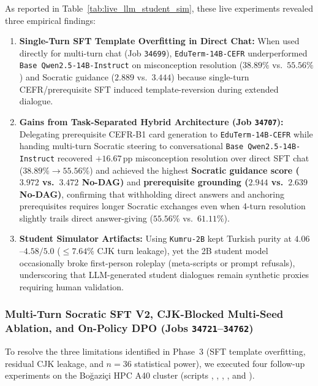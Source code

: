 \documentclass[a4paper,12pt]{report}
\begin{document}
As reported in Table~\ref{tab:live_llm_student_sim}, these live experiments revealed three empirical findings:
\begin{enumerate}
    \item \textbf{Single-Turn SFT Template Overfitting in Direct Chat:} When used directly for multi-turn chat (Job \texttt{34699}), \texttt{EduTerm-14B-CEFR} underperformed \texttt{Base Qwen2.5-14B-Instruct} on misconception resolution ($38.89\%$ vs.\ $55.56\%$) and Socratic guidance ($2.889$ vs.\ $3.444$) because single-turn CEFR/prerequisite SFT induced template-reversion during extended dialogue.
    \item \textbf{Gains from Task-Separated Hybrid Architecture (Job \texttt{34707}):} Delegating prerequisite CEFR-B1 card generation to \texttt{EduTerm-14B-CEFR} while handing multi-turn Socratic steering to conversational \texttt{Base Qwen2.5-14B-Instruct} recovered $+16.67$\,pp misconception resolution over direct SFT chat ($38.89\% \to 55.56\%$) and achieved the highest \textbf{Socratic guidance score ($3.972$ vs.\ $3.472$ No-DAG)} and \textbf{prerequisite grounding ($2.944$ vs.\ $2.639$ No-DAG)}, confirming that withholding direct answers and anchoring prerequisites requires longer Socratic exchanges even when 4-turn resolution slightly trails direct answer-giving ($55.56\%$ vs.\ $61.11\%$).
    \item \textbf{Student Simulator Artifacts:} Using \texttt{Kumru-2B} kept Turkish purity at $4.06$--$4.58/5.0$ ($\le 7.64\%$ CJK turn leakage), yet the 2B student model occasionally broke first-person roleplay (meta-scripts or prompt refusals), underscoring that LLM-generated student dialogues remain synthetic proxies requiring human validation.
\end{enumerate}

\subsubsection{Multi-Turn Socratic SFT V2, CJK-Blocked Multi-Seed Ablation, and On-Policy DPO (Jobs \texttt{34721}--\texttt{34762})}
\label{sec:cjk_blocked_onpolicy_dpo}

To resolve the three limitations identified in Phase~3 (SFT template overfitting, residual CJK leakage, and $n=36$ statistical power), we executed four follow-up experiments on the Bo\u{g}azi\c{c}i HPC A40 cluster (scripts , , , , and ).
\end{document}
